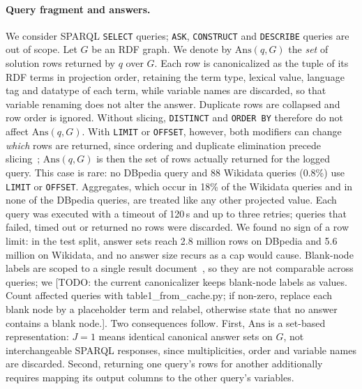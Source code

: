 \documentclass[runningheads]{llncs}
\newcommand{\Ans}{\mathrm{Ans}}
\newcommand{\hp}[1]{{\color{red!75!black}#1}}
\begin{document}
\paragraph{Query fragment and answers.}
We consider SPARQL \texttt{SELECT} queries; \texttt{ASK}, \texttt{CONSTRUCT}
and \texttt{DESCRIBE} queries are out of scope. Let $G$ be an RDF graph. We
denote by $\Ans(q,G)$ the \emph{set} of solution rows returned by $q$ over
$G$. Each row is canonicalized as the tuple of its RDF terms in projection
order, retaining the term type, lexical value, language tag and datatype of
each term, while variable names are discarded, so that variable renaming does
not alter the answer. Duplicate rows are collapsed and row order is ignored.
Without slicing, \texttt{DISTINCT} and \texttt{ORDER BY} therefore do not
affect $\Ans(q,G)$. With \texttt{LIMIT} or \texttt{OFFSET}, however, both
modifiers can change \emph{which} rows are returned, since ordering and
duplicate elimination precede slicing~\cite{w3c2013sparql11}; $\Ans(q,G)$ is
then the set of rows actually returned for the logged query. This case is
rare: no DBpedia query and 88 Wikidata queries (0.8\%) use \texttt{LIMIT} or
\texttt{OFFSET}. Aggregates, which occur in 18\% of the Wikidata queries and in
none of the DBpedia queries, are treated like any other projected value.
Each query was executed with a timeout of 120\,s and up to three retries;
queries that failed, timed out or returned no rows were discarded.
We found no sign of a row limit: in the test split, answer sets reach 2.8
million rows on DBpedia and 5.6 million on Wikidata, and no answer size
recurs as a cap would cause. Blank-node labels are
scoped to a single result document~\cite{w3c2013sparqljson}, so they are not
comparable across queries; we \hp{[TODO: the current canonicalizer keeps
blank-node labels as values. Count affected queries with
table1\_from\_cache.py; if non-zero, replace each blank node by a placeholder
term and relabel, otherwise state that no answer contains a blank node.]}.
Two consequences follow. First, $\Ans$ is a set-based representation:
$J = 1$ means identical canonical answer sets on $G$, not interchangeable
SPARQL responses, since multiplicities, order and variable names are
discarded. Second, returning one query's rows for another additionally
requires mapping its output columns to the other query's variables.
\end{document}
